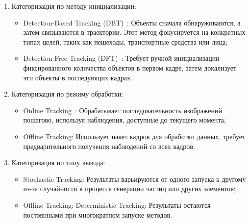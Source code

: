 \begin{enumerate}

	\item Категоризация по методу инициализации: 
		
	\begin{itemize}
		
		\item Detection-Based Tracking (DBT)~\cite{Bose2007, Song2010}: Объекты сначала обнаруживаются, а затем 		связываются в траектории. Этот метод фокусируется на конкретных типах целей, таких как пешеходы, транспортные средства или лица;
		
		\item Detection-Free Tracking (DFT)~\cite{Zhang2013}: Требует ручной инициализации фиксированного количества объектов в первом кадре, затем локализует эти объекты в последующих кадрах.
	
	\end{itemize}
	
	\item Категоризация по режиму обработки:
	
	\begin{itemize}
		
		\item Online Tracking~\cite{Xiang2015}: Обрабатывает последовательность изображений пошагово, используя наблюдения, доступные до текущего момента;
		
		\item Offline Tracking: Использует пакет кадров для обработки данных, требует предварительного получения наблюдений со всех кадров.
		
	\end{itemize}
	
	\item Категоризация по типу вывода:
	
	\begin{itemize}
		
		\item Stochastic Tracking: Результаты варьируются от одного запуска к другому из-за случайности в процессе генерации частиц или других элементов;
		
		\item Offline Tracking: Deterministic Tracking: Результаты остаются постоянными при многократном запуске методов.
		
	\end{itemize}
	
\end{enumerate}

